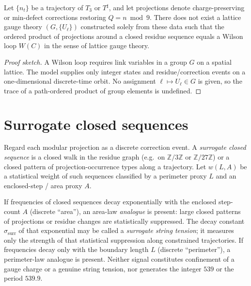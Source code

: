 \begin{theorem}
\label{thm:no-wilson}
Let \(\{n_t\}\) be a trajectory of \(T_3\) or \(T^\sharp\), and let projections
denote charge-preserving or min-defect corrections restoring \(Q=n\bmod 9\).
There does not exist a lattice gauge theory \((G,\{U_\ell\})\) constructed
solely from these data such that the ordered product of projections around a
closed residue sequence equals a Wilson loop \(W(C)\) in the sense of lattice
gauge theory.
\end{theorem}

\begin{proof}[Proof sketch]
A Wilson loop requires link variables in a group \(G\) on a spatial lattice.
The model supplies only integer states and residue/correction events on a
one-dimensional discrete-time orbit. No assignment \(\ell\mapsto U_\ell\in G\)
is given, so the trace of a path-ordered product of group elements is undefined.
\end{proof}

\section{Surrogate closed sequences}

\begin{definition}
Regard each modular projection as a discrete correction event. A
\emph{surrogate closed sequence} is a closed walk in the residue graph
(e.g.\ on \(\mathbb{Z}/3\mathbb{Z}\) or \(\mathbb{Z}/27\mathbb{Z}\)) or a closed
pattern of projection-occurrence types along a trajectory. Let \(w(L,A)\) be a
statistical weight of such sequences classified by a perimeter proxy \(L\) and
an enclosed-step / area proxy \(A\).
\end{definition}

\begin{remark}
If frequencies of closed sequences decay exponentially with the enclosed
step-count \(A\) (discrete ``area''), an area-law \emph{analogue} is present:
large closed patterns of projections or residue changes are statistically
suppressed. The decay constant \(\sigma_{\mathrm{surr}}\) of that exponential
may be called a \emph{surrogate string tension}; it measures only the strength
of that statistical suppression along constrained trajectories. If frequencies
decay only with the boundary length \(L\) (discrete ``perimeter''), a
perimeter-law analogue is present. Neither signal constitutes confinement of a
gauge charge or a genuine string tension, nor generates the integer \(539\) or
the period \(539.9\).
\end{remark}

